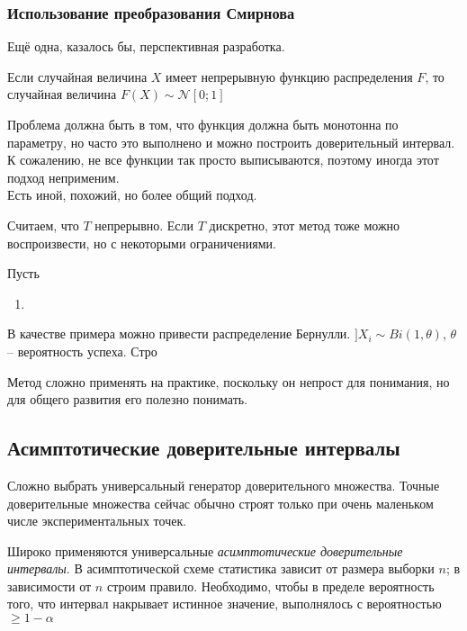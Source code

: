 \documentclass[main.tex]{subfiles}
\begin{document}
\subsubsection{Использование преобразования Смирнова}

Ещё одна, казалось бы, перспективная разработка.

Если случайная величина $ X $ имеет непрерывную функцию распределения $ F $, то случайная величина $ F(X) \sim \mathcal N[0;1] $ 

Проблема должна быть в том, что функция должна быть монотонна по параметру, но часто это выполнено и можно построить доверительный интервал.
К сожалению, не все функции так просто выписываются, поэтому иногда этот подход неприменим. \\

Есть иной, похожий, но более общий подход.

Считаем, что $ T $ непрерывно.
Если $ T $ дискретно, этот метод тоже можно воспроизвести, но с некоторыми ограничениями.

\begin{thrm}
	Пусть
	\begin{enumerate}[noitemsep]
		\item  %
	\end{enumerate}
\end{thrm}

В качестве примера можно привести распределение Бернулли.
$ ] X_i \sim Bi(1, \theta) $, $ \theta $ -- вероятность успеха.
Стро

\begin{leftbar}
	Метод сложно применять на практике, поскольку он непрост для понимания, но для общего развития его полезно понимать.
\end{leftbar}

\subsection{Асимптотические доверительные интервалы}

Сложно выбрать универсальный генератор доверительного множества.
Точные доверительные множества сейчас обычно строят только при очень маленьком числе экспериментальных точек.

Широко применяются универсальные \emph{асимптотические доверительные интервалы}.
В асимптотической схеме статистика зависит от размера выборки $ n $; в зависимости от $ n $ строим правило.
Необходимо, чтобы в пределе вероятность того, что интервал накрывает истинное значение, выполнялось с вероятностью $ \ge 1 - \alpha $
\end{document}
